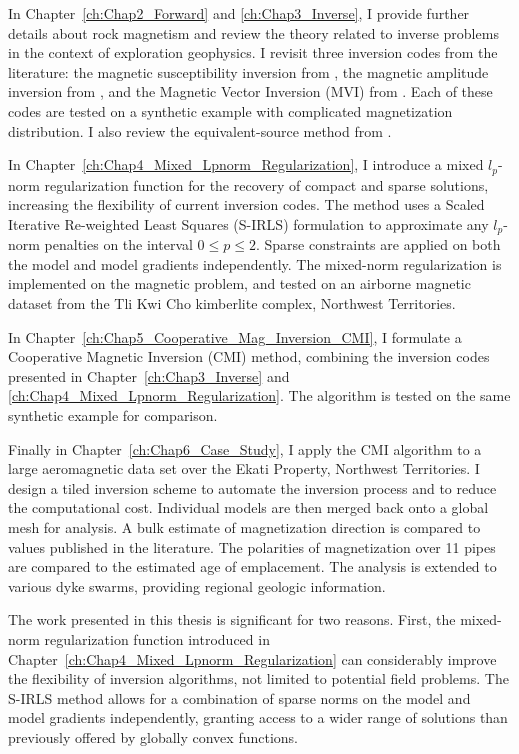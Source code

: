 In Chapter~\ref{ch:Chap2_Forward} and \ref{ch:Chap3_Inverse}, I provide further details about rock magnetism and review the theory related to inverse problems in the context of exploration geophysics. I revisit three inversion codes from the literature: the magnetic susceptibility inversion from \cite[]{LiOldenburg1996}, the magnetic amplitude inversion from \cite{Shearer05}, and the Magnetic Vector Inversion (MVI) from \cite[]{PhDLelievre09}.
Each of these codes are tested on a synthetic example with complicated magnetization distribution.
I also review the equivalent-source method from \cite{Li2010}.

In Chapter~\ref{ch:Chap4_Mixed_Lpnorm_Regularization}, I introduce a mixed $l_p$-norm regularization function for the recovery of compact and sparse solutions, increasing the flexibility of current inversion codes.
The method uses a Scaled Iterative Re-weighted Least Squares (S-IRLS) formulation to approximate any $l_p$-norm penalties on the interval $0 \le p \le 2$.
Sparse constraints are applied on both the model and model gradients independently.
The mixed-norm regularization is implemented on the magnetic problem, and tested on an airborne magnetic dataset from the Tli Kwi Cho kimberlite complex, Northwest Territories.

In Chapter~\ref{ch:Chap5_Cooperative_Mag_Inversion_CMI}, I formulate a Cooperative Magnetic Inversion (CMI) method, combining the inversion codes presented in Chapter~\ref{ch:Chap3_Inverse} and \ref{ch:Chap4_Mixed_Lpnorm_Regularization}.
The algorithm is tested on the same synthetic example for comparison.

Finally in Chapter~\ref{ch:Chap6_Case_Study}, I apply the CMI algorithm to a large aeromagnetic data set over the Ekati Property, Northwest Territories.
I design a tiled inversion scheme to automate the inversion process and to reduce the computational cost.
Individual models are then merged back onto a global mesh for analysis.
A bulk estimate of magnetization direction is compared to values published in the literature.
The polarities of magnetization over 11 pipes are compared to the estimated age of emplacement.
The analysis is extended to various dyke swarms, providing regional geologic information.

The work presented in this thesis is significant for two reasons.
First, the mixed-norm regularization function introduced in Chapter~\ref{ch:Chap4_Mixed_Lpnorm_Regularization} can considerably improve the flexibility of inversion algorithms, not limited to potential field problems.
The S-IRLS method allows for a combination of sparse norms on the model and model gradients independently, granting access to a wider range of solutions than previously offered by globally convex functions.

